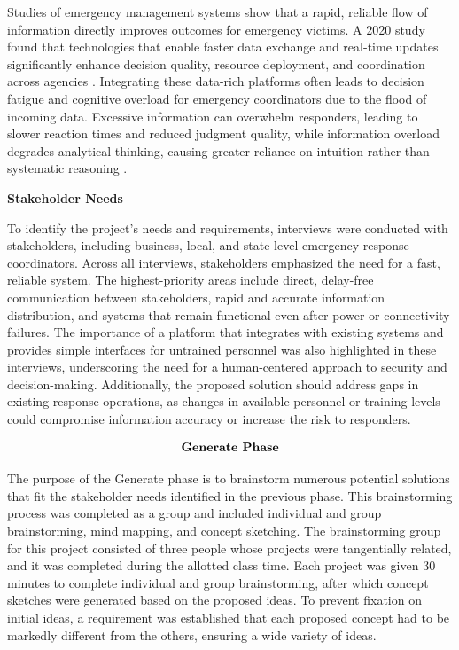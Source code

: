 \documentclass[english,12pt,a4paper,titlepage]{article}
\begin{document}
	Studies of emergency management systems show that a rapid, reliable flow of information directly improves outcomes for emergency victims. A 2020 study found that technologies that enable faster data exchange and real-time updates significantly enhance decision quality, resource deployment, and coordination across agencies \autocite{Kedia2022}. Integrating these data-rich platforms often leads to decision fatigue and cognitive overload for emergency coordinators due to the flood of incoming data. Excessive information can overwhelm responders, leading to slower reaction times and reduced judgment quality, while information overload degrades analytical thinking, causing greater reliance on intuition rather than systematic reasoning \autocite{Roberts2020}.
	
	\label{Describe Phase - Stakeholder Needs}
	\begin{flushleft}
	\bfseries{Stakeholder Needs}
	\end{flushleft}
	
	To identify the project's needs and requirements, interviews were conducted with stakeholders, including business, local, and state-level emergency response coordinators. Across all interviews, stakeholders emphasized the need for a fast, reliable system. The highest-priority areas include direct, delay-free communication between stakeholders, rapid and accurate information distribution, and systems that remain functional even after power or connectivity failures. The importance of a platform that integrates with existing systems and provides simple interfaces for untrained personnel was also highlighted in these interviews, underscoring the need for a human-centered approach to security and decision-making. Additionally, the proposed solution should address gaps in existing response operations, as changes in available personnel or training levels could compromise information accuracy or increase the risk to responders.
	
	
	\[
	\begin{array}{cc}
		\mbox{\bfseries{Generate Phase}}
		\label{Generate Phase}
	\end{array}
	\]

	The purpose of the Generate phase is to brainstorm numerous potential solutions that fit the stakeholder needs identified in the previous phase. This brainstorming process was completed as a group and included individual and group brainstorming, mind mapping, and concept sketching. The brainstorming group for this project consisted of three people whose projects were tangentially related, and it was completed during the allotted class time. Each project was given 30 minutes to complete individual and group brainstorming, after which concept sketches were generated based on the proposed ideas. To prevent fixation on initial ideas, a requirement was established that each proposed concept had to be markedly different from the others, ensuring a wide variety of ideas.
	
\end{document}
